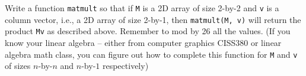   Write a function \verb!matmult! so that if \verb!M! is a 2D array of
  size 2-by-2 and \verb!v! is a column vector, i.e., a 2D array of size
  2-by-1, then \verb!matmult(M, v)! will return the product \verb!Mv!
  as described above.
  Remember to mod by 26 all the values.
  (If you know your linear algebra -- either from computer graphics CISS380
  or linear algebra math class, you can figure out how to complete
  this function for \verb!M! and \verb!v! of sizes
  $n$-by-$n$ and $n$-by-$1$ respectively)
